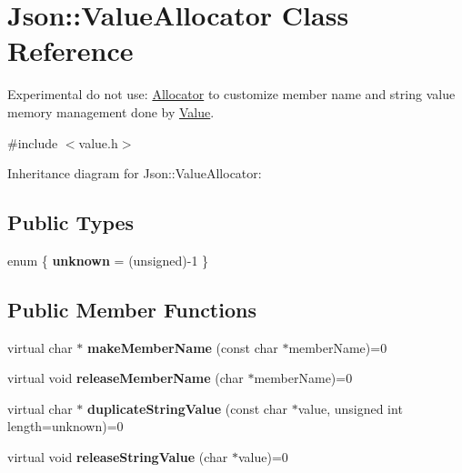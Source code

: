 \hypertarget{class_json_1_1_value_allocator}{\section{Json\+:\+:Value\+Allocator Class Reference}
\label{class_json_1_1_value_allocator}
}


Experimental do not use\+: \hyperlink{class_allocator}{Allocator} to customize member name and string value memory management done by \hyperlink{class_json_1_1_value}{Value}.  




{\ttfamily \#include $<$value.\+h$>$}



Inheritance diagram for Json\+:\+:Value\+Allocator\+:
\subsection*{Public Types}
\begin{DoxyCompactItemize}
\item 
\hypertarget{class_json_1_1_value_allocator_acdcdc93e9d2a4da8a119d65e81791de0}{enum \{ {\bfseries unknown} = (unsigned)-\/1
 \}}\label{class_json_1_1_value_allocator_acdcdc93e9d2a4da8a119d65e81791de0}

\end{DoxyCompactItemize}
\subsection*{Public Member Functions}
\begin{DoxyCompactItemize}
\item 
\hypertarget{class_json_1_1_value_allocator_af2370043912c62bb2f3d3277b2c0a125}{virtual char $\ast$ {\bfseries make\+Member\+Name} (const char $\ast$member\+Name)=0}\label{class_json_1_1_value_allocator_af2370043912c62bb2f3d3277b2c0a125}

\item 
\hypertarget{class_json_1_1_value_allocator_ae8206cbaf1004994696a1ffec0d7e29a}{virtual void {\bfseries release\+Member\+Name} (char $\ast$member\+Name)=0}\label{class_json_1_1_value_allocator_ae8206cbaf1004994696a1ffec0d7e29a}

\item 
\hypertarget{class_json_1_1_value_allocator_aaa63197291f55d060541a01fcf5a5dfc}{virtual char $\ast$ {\bfseries duplicate\+String\+Value} (const char $\ast$value, unsigned int length=unknown)=0}\label{class_json_1_1_value_allocator_aaa63197291f55d060541a01fcf5a5dfc}

\item 
\hypertarget{class_json_1_1_value_allocator_aa75c50f08bab7db386673ab355668c99}{virtual void {\bfseries release\+String\+Value} (char $\ast$value)=0}\label{class_json_1_1_value_allocator_aa75c50f08bab7db386673ab355668c99}

\end{DoxyCompactItemize}


